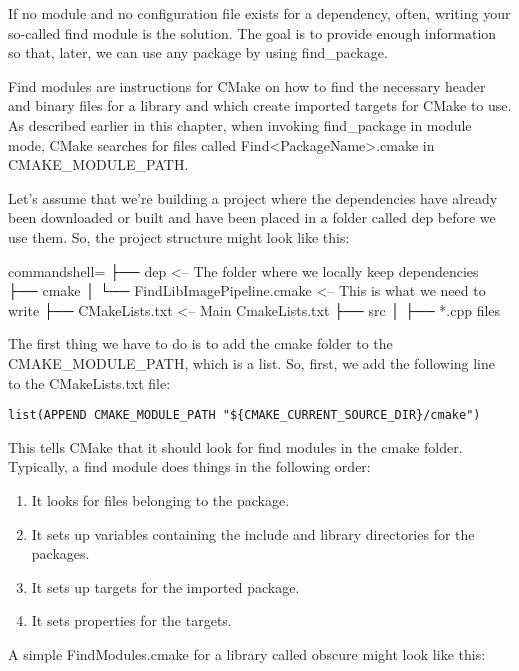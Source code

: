 If no module and no configuration file exists for a dependency, often, writing your so-called find module is the solution. The goal is to provide enough information so that, later, we can use any package by using find\_package.

Find modules are instructions for CMake on how to find the necessary header and binary files for a library and which create imported targets for CMake to use. As described earlier in this chapter, when invoking find\_package in module mode, CMake searches for files called Find<PackageName>.cmake in CMAKE\_MODULE\_PATH.

Let's assume that we're building a project where the dependencies have already been downloaded or built and have been placed in a folder called dep before we use them. So, the project structure might look like this:

\begin{tcblisting}{commandshell={}}
├── dep <-- The folder where we locally keep dependencies
├── cmake
│       └── FindLibImagePipeline.cmake <-- This is what we need to write
├── CMakeLists.txt <-- Main CmakeLists.txt
├── src
│       ├── *.cpp files
\end{tcblisting}

The first thing we have to do is to add the cmake folder to the CMAKE\_MODULE\_PATH, which is a list. So, first, we add the following line to the CMakeLists.txt file:

\begin{lstlisting}[style=styleCMake]
list(APPEND CMAKE_MODULE_PATH "${CMAKE_CURRENT_SOURCE_DIR}/cmake")
\end{lstlisting}

This tells CMake that it should look for find modules in the cmake folder. Typically, a find module does things in the following order:

\begin{enumerate}
\item 
It looks for files belonging to the package.
	
\item 
It sets up variables containing the include and library directories for the packages.

\item 
It sets up targets for the imported package.

\item 
It sets properties for the targets.
\end{enumerate}

A simple FindModules.cmake for a library called obscure might look like this:

